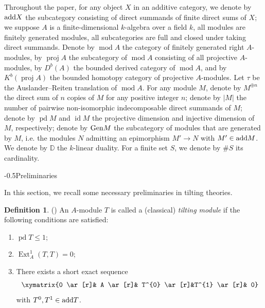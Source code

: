 \documentclass[reqno,12pt]{amsart}
\makeatletter
\numberwithin{equation}{section}
\theoremstyle{plain}
\theoremstyle{definition}
\newtheorem{definition}[theorem]{\bf Definition}
\renewcommand{\section}{\@startsection{section}{1}{0mm}
  {-\baselineskip}{0.5\baselineskip}{\bf\leftline}}
\makeatother
\begin{document}
Throughout the paper, for any object $X$ in an additive category, we denote by ${\rm add} X$ the subcategory consisting of direct summands of finite direct sums of $X$;
we suppose $A$ is a finite-dimensional $k$-algebra over a field $k$, all modules are finitely generated modules, all subcategories are full and closed under taking direct summands. Denote by $\operatorname{mod} A$ the category of finitely generated right $A$-modules, by $\operatorname{proj}A$ the subcategory of $\operatorname{mod} A$ consisting of all projective $A$-modules, by $D^b(A)$ the bounded derived category of $\operatorname{mod}A$, and by $K^b(\operatorname{proj}A)$ the bounded homotopy category of projective $A$-modules. Let $\tau$ be the Auslander--Reiten translation of $\operatorname{mod} A$. For any module $M$, denote by $M^{\oplus n}$ the direct sum of $n$ copies of $M$ for any positive integer $n$; denote by $|M|$ the number of pairwise non-isomorphic indecomposable direct summands of $M$; denote by $\operatorname{pd} M$ and $\operatorname{id} M$ the projective dimension and injective dimension of $M$, respectively; denote by ${\rm Gen} M$ the subcategory of modules that are generated by $M$, i.e. the modules $N$ admitting an epimorphism $M'\to N$ with $M'\in{\rm add} M$. We denote by $\mathbb{D}$ the $k$-linear duality. For a finite set $S$, we denote by $\# S$ its cardinality.

\section{Preliminaries}

In this section, we recall some necessary preliminaries in tilting theories.

\begin{definition}\label{tilting} (\cite{Happel})
An \( A \)-module \( T \) is called a (classical) {\em tilting module} if the following conditions are satisfied:
\begin{enumerate}
\item[(T1)] \( \operatorname{pd} T \leq 1 \);
\item[(T2)] \( \operatorname{Ext}_A^1(T, T) = 0 \);
\item[(T3)] There exists a short exact sequence
$$\xymatrix{0 \ar[r]& A \ar[r]& T^{0} \ar[r]&T^{1} \ar[r]& 0}$$
with \( T^{0} , T^{1}  \in  {\rm add} T \).
\end{enumerate}
\end{definition}
\end{document}
